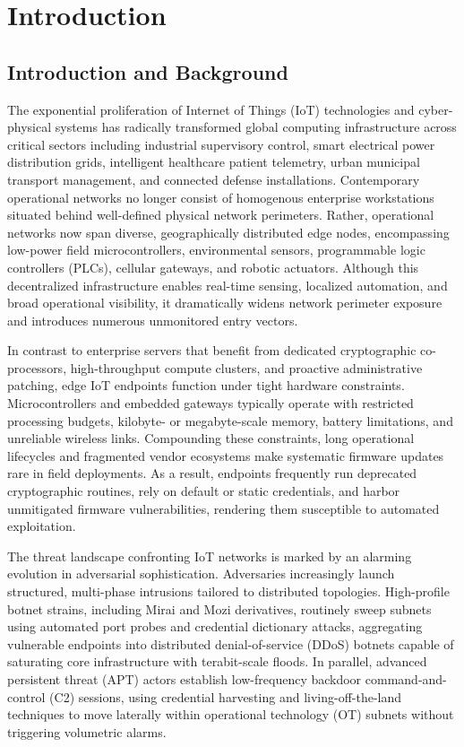 \documentclass[12pt,a4paper]{report}
\begin{document}
\chapter{Introduction}\label{ch:intro}
\label{chap:intro}

\section{Introduction and Background}\label{sec:background}

The exponential proliferation of Internet of Things (IoT) technologies and cyber-physical systems has radically transformed global computing infrastructure across critical sectors including industrial supervisory control, smart electrical power distribution grids, intelligent healthcare patient telemetry, urban municipal transport management, and connected defense installations. Contemporary operational networks no longer consist of homogenous enterprise workstations situated behind well-defined physical network perimeters. Rather, operational networks now span diverse, geographically distributed edge nodes, encompassing low-power field microcontrollers, environmental sensors, programmable logic controllers (PLCs), cellular gateways, and robotic actuators. Although this decentralized infrastructure enables real-time sensing, localized automation, and broad operational visibility, it dramatically widens network perimeter exposure and introduces numerous unmonitored entry vectors.

In contrast to enterprise servers that benefit from dedicated cryptographic co-processors, high-throughput compute clusters, and proactive administrative patching, edge IoT endpoints function under tight hardware constraints. Microcontrollers and embedded gateways typically operate with restricted processing budgets, kilobyte- or megabyte-scale memory, battery limitations, and unreliable wireless links. Compounding these constraints, long operational lifecycles and fragmented vendor ecosystems make systematic firmware updates rare in field deployments. As a result, endpoints frequently run deprecated cryptographic routines, rely on default or static credentials, and harbor unmitigated firmware vulnerabilities, rendering them susceptible to automated exploitation.

The threat landscape confronting IoT networks is marked by an alarming evolution in adversarial sophistication. Adversaries increasingly launch structured, multi-phase intrusions tailored to distributed topologies. High-profile botnet strains, including Mirai and Mozi derivatives, routinely sweep subnets using automated port probes and credential dictionary attacks, aggregating vulnerable endpoints into distributed denial-of-service (DDoS) botnets capable of saturating core infrastructure with terabit-scale floods. In parallel, advanced persistent threat (APT) actors establish low-frequency backdoor command-and-control (C2) sessions, using credential harvesting and living-off-the-land techniques to move laterally within operational technology (OT) subnets without triggering volumetric alarms.
\end{document}
